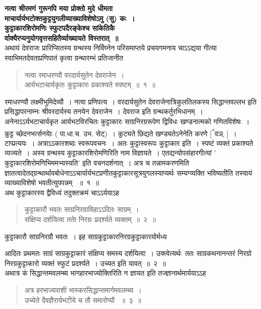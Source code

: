 \documentclass[11pt, openany]{book}
\begin{document}
\vspace{2mm}

\textbf{ नत्वा श्रीरमणं गुरूनपि मया प्रोक्तो मुदे धीमता \textendash \\
\hspace{2cm}
माचार्यार्यभटोक्तकुट्टयुगलीव्याख्याविशेषोऽमु (सु) कः~।\\
कुट्टाकारशिरोमणिः स्फुटपदैरङ्केश्च सांकेतिकै \textendash\\
\hspace{2cm}
र्वाक्यैरप्यनुयोगवृत्तसहितैर्व्याख्यायते विस्तरात्~॥}\\

\justifying
\indent
अथायं देवराजः प्रारिप्सितस्य ग्रन्थस्य निर्विघ्नेन परिसमाप्तये प्रचयगमनाय
चाऽऽद्यया गीत्या स्वाभिमतदेवताप्रणिपातं कृत्वा ग्रन्थारम्भं प्रतिजानीत \textendash\\
\begin{quote}
\ks 
नत्वा रमाधरण्यौ वरदार्यसुतेन देवराजेन~।\\
आर्यभटाचार्यकृतः कुट्टाकारः प्रकाश्यते स्पष्टम्~॥~१~॥
\end{quote}

\indent
रमाधरण्यौ लक्ष्मीभुमिदेव्यौ~। नत्वा प्रणिपत्य~। वरदार्यसुतेन देवराजेनात्रिकुलतिलकस्य सिद्धान्तवल्लभ इति प्रसिद्धापरनाम्नः श्रीवरदार्यस्य तनयेन देवराजेन~। देवराज इति ग्रन्थकर्तुरभिधानम्~। अनेनाऽऽर्यभटाचार्यकृत आर्यभटविरचितः कुट्टाकारः साग्रनिरग्ररूपेण द्विविधः खण्डनात्मको गणितविशेषः~। कुट्ट च्छेदनभर्त्सनयाेः ( पा.धा.च. उभ. सेट्)~। कुट्यते छिद्यते खण्ड्यतेऽनेनेति करणे [\textsuperscript{*}वञ्~]~। टाप्प्रत्ययः~। अत्राऽऽकारशब्दः स्वरूपवचनः~। अतः कुट्टास्वरूपः कुट्टाकार इति~। स्पष्टं व्यक्तं प्रकाश्यते व्यज्यते~। अस्य ग्रन्थस्य कुट्टाकारशिरोमणिरिति नाम विज्ञायते~। एतद्यन्योपसंहारगीत्यां ' कुट्टाकारशिरोमणिभिममभ्यस्यति' इति वचनदर्शनात्~। अत्र च तन्नामकरणमिति ज्ञातत्वादेतद्ग्रन्थार्थावबोधेनाऽऽचार्यार्यभटप्रणीतकुट्टाकारसूत्रयुगलस्याप्यर्थः सम्यग्व्यक्ति भविष्यतीति तस्यायं व्याख्याविशेषो भवतीत्युपपन्नम् ~॥~१~॥\\
\indent
अथ कुट्टाकारस्य द्वैविध्यं तदुक्तक्रमं चाऽऽर्ययाऽह \textendash
\begin{quote}
\ks
कुट्टाकारौ भवतः साग्रनिरग्राविहाऽऽदितः साग्रम्~।\\
संक्षिप्य दर्शयित्वा तताे निरग्रः प्रदर्श्यते व्यक्तम्~॥~२~॥
\end{quote}
\indent
कुट्टाकारौ साग्रनिरग्रौ भवतः~। इह साग्रकुट्टाकारनिरग्रकुट्टाकारयोर्मध्य

\newpage
\thispagestyle{fancy}
\fancyhf{}
\noindent
आदितः प्रथमतः साग्रं साग्रकुट्टाकारं संक्षिप्य समस्य दर्शयित्वा~। उक्त्वेत्यर्थः\textendash \ ततः साग्रकथनानन्तरं निरग्रो निरग्रकुट्टाकारो व्यक्तं स्फुटं
प्रदर्श्यते~। उच्यत इति यावत्~॥~२~॥\\
\indent
अथात्र कं सिद्धान्तमवलम्ब्य भागहारभाज्योक्तिरिति न ज्ञायत इति
तज्ज्ञानार्थमार्ययाऽऽह \textendash
\begin{quote}
\ks
अत्र हरभाज्यराशी भास्करसिद्धान्तमार्गमवलम्ब्य~।\\
उच्येते दैवज्ञैरार्यभटीये च तौ समारोप्यौ ~॥~३~॥
\end{quote}
\end{document}
